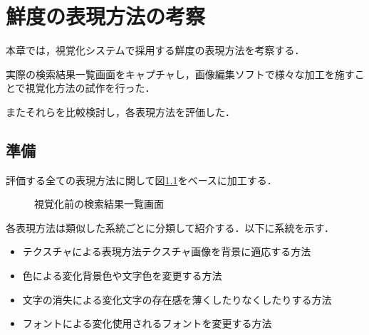 \chapter{鮮度の表現方法の考察}
\label{chap:verification}

本章では，視覚化システムで採用する鮮度の表現方法を考察する．

実際の検索結果一覧画面をキャプチャし，画像編集ソフトで様々な加工を施すことで視覚化方法の試作を行った．

またそれらを比較検討し，各表現方法を評価した．

\newpage

\section{準備}

評価する全ての表現方法に関して図\ref{fig:ver-base}をベースに加工する．

\begin{figure}[htbp]
  \begin{center}
  \end{center}
  \caption{視覚化前の検索結果一覧画面}
  \label{fig:ver-base}
\end{figure}

各表現方法は類似した系統ごとに分類して紹介する．以下に系統を示す．

\begin{itemize}
  \item{テクスチャによる表現方法}テクスチャ画像を背景に適応する方法
  \item{色による変化}背景色や文字色を変更する方法
  \item{文字の消失による変化}文字の存在感を薄くしたりなくしたりする方法
  \item{フォントによる変化}使用されるフォントを変更する方法
\end{itemize}

